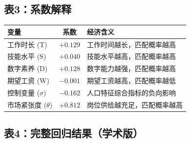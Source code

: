 \documentclass[12pt, a4paper]{article}
\begin{document}
\vspace{1cm}

\subsection*{表3：系数解释}

\begin{table}[htbp]
\centering
\begin{tabular}{lcl}
\toprule
\textbf{变量} & \textbf{系数} & \textbf{经济含义} \\
\midrule
工作时长 (T) & $+0.129$ & 工作时间越长，匹配概率越高 \\
技能水平 (S) & $+0.040$ & 技能水平越高，匹配概率越高 \\
数字素养 (D) & $+0.128$ & 数字能力越强，匹配概率越高 \\
期望工资 (W) & $-0.001$ & 期望工资越高，匹配概率越低 \\
控制变量 ($\sigma$) & $-0.162$ & 人口特征综合指标的负向影响 \\
市场紧张度 ($\theta$) & $+0.812$ & 岗位供给越充足，匹配概率越高 \\
\bottomrule
\end{tabular}
\end{table}

\newpage

\subsection*{表4：完整回归结果（学术版）}
\end{document}
